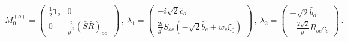 \begin{equation}
M_{0}^{\left( o\right) }=\left( 
\begin{array}{cc}
{\frac{1}{2}}\mathbf{1}_{o} & 0 \\ 
0 & {\frac{2}{{\theta ^{\prime }}^{2}}}\left( \bar{S}\bar{R}\right)
_{oo^{\prime }}
\end{array}
\right) \,,~\lambda _{1}=\left( 
\begin{array}{c}
-i\sqrt{2}\hat{c}_{o} \\ 
\frac{2i}{\theta ^{\prime }}\bar{S}_{oe}\left( -\sqrt{2}\hat{b}_{e}+w_{e}\xi
_{0}\right) 
\end{array}
\right) \,,~\lambda _{2}=\left( 
\begin{array}{c}
-\sqrt{2}\hat{b}_{o} \\ 
-{\frac{2\sqrt{2}}{\theta ^{\prime }}}R_{oe}\hat{c}_{e}
\end{array}
\right)\,.   \label{e_def_M_lambda}
\end{equation}

